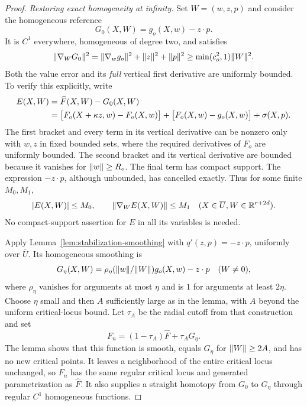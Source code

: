 \begin{proof}
\emph{Restoring exact homogeneity at infinity.}
Set $W=(w,z,p)$ and consider the homogeneous reference
\begin{equation}
 G_0(X,W)=g_o(X,w)-z\cdot p.
 \label{eq:transport-homogeneous-reference}
\end{equation}
It is $C^1$ everywhere, homogeneous of degree two, and satisfies
\begin{equation}
 \lVert\nabla_WG_0\rVert^2
  =\lVert\nabla_wg_o\rVert^2+\lVert z\rVert^2+\lVert p\rVert^2
  \ge\min(c_o^2,1)\lVert W\rVert^2.
 \label{eq:transport-reference-gradient}
\end{equation}
Both the value error and its \emph{full} vertical first derivative
are uniformly bounded.  To verify this explicitly, write
\begin{align}
 E(X,W)&=\widehat F(X,W)-G_0(X,W)\notag\\
  &=\bigl[F_o(X+\kappa z,w)-F_o(X,w)\bigr]
      +\bigl[F_o(X,w)-g_o(X,w)\bigr]+\sigma(X,p).
 \label{eq:transport-error-decomposition}
\end{align}
The first bracket and every term in its vertical derivative can be
nonzero only with $w,z$ in fixed bounded sets, where the required
derivatives of $F_o$ are uniformly bounded.  The second bracket and
its vertical derivative are bounded because it vanishes for
$\lVert w\rVert\ge R_o$.  The final term has compact support.  The expression
$-z\cdot p$, although unbounded, has cancelled exactly.  Thus for
some finite $M_0,M_1$,
\begin{equation}
 \lvert E(X,W)\rvert\le M_0,
 \qquad \lVert\nabla_WE(X,W)\rVert\le M_1
 \quad(X\in\overline U, W\in\mathbb R^{r+2d}).
 \label{eq:transport-bounded-error}
\end{equation}
No compact-support assertion for $E$ in all its variables is needed.

Apply Lemma~\ref{lem:stabilization-smoothing} with
$q'(z,p)=-z\cdot p$, uniformly over $\overline U$. Its homogeneous
smoothing is
\begin{equation}
 G_\eta(X,W)=
   \rho_\eta(\lVert w\rVert/\lVert W\rVert)g_o(X,w)-z\cdot p
 \quad(W\ne0),
 \label{eq:transport-angular-smoothing}
\end{equation}
where $\rho_\eta$ vanishes for arguments at most $\eta$ and is $1$
for arguments at least $2\eta$. Choose $\eta$ small and then $A$
sufficiently large as in the lemma, with $A$ beyond the uniform
critical-locus bound. Let $\tau_A$ be the radial cutoff from that
construction and set
\begin{equation}
 F_n=(1-\tau_A)\widehat F+\tau_A G_\eta.
 \label{eq:transport-final-step-family}
\end{equation}
The lemma shows that this function is smooth, equals $G_\eta$ for
$\lVert W\rVert\ge2A$, and has no new critical points. It leaves a
neighborhood of the entire critical locus unchanged, so $F_n$ has
the same regular critical locus and generated parametrization as
$\widehat F$. It also supplies a straight homotopy from $G_0$ to
$G_\eta$ through regular $C^1$ homogeneous functions.


\end{proof}
